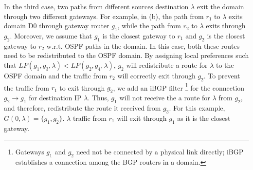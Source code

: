 In the third case, two paths from different sources 
destination $\lambda$ exit
the domain through two different
gateways.
For example, in (b),
the path from $r_1$ to $\lambda$ exits domain D0 through 
gateway router $g_1$, while the path from $r_2$  to $\lambda$ exits 
through $g_2$. 
Moreover,  we assume that $g_1$ is the closest gateway to $r_1$ and 
$g_2$ is the closest gateway to $r_2$ w.r.t. OSPF paths in the domain.
In this case, both these routes need to be  
redistributed to the OSPF domain. 
By assigning local preferences such that
$LP(g_1,g_3,\lambda)<LP(g_2,g_4,\lambda)$,
 $g_2$ will redistribute a route for $\lambda$ 
 to the OSPF domain and
the traffic from $r_2$ will correctly exit through $g_2$. 
To prevent the traffic from $r_1$ to exit through $g_2$,
we add an iBGP filter
\footnote{Gateways $g_1$ and $g_2$ need not be connected by a physical 
	link directly; iBGP establishes a connection among the 
	BGP routers in a domain.}
 for the connection $g_2 \rightarrow g_1$ for
destination IP $\lambda$. 
Thus, $g_1$ will not receive the
a route for $\lambda$ from $g_2$, and therefore,
redistribute the route it received from $g_3$. For 
this example, $G(0, \lambda) = \{g_1, g_2\}$.
$\lambda$ traffic from $r_1$ will exit through $g_1$ 
as it is the closest gateway. 

\begin{figure}
	\centering
	\hfill
	\hfill
\end{figure}


